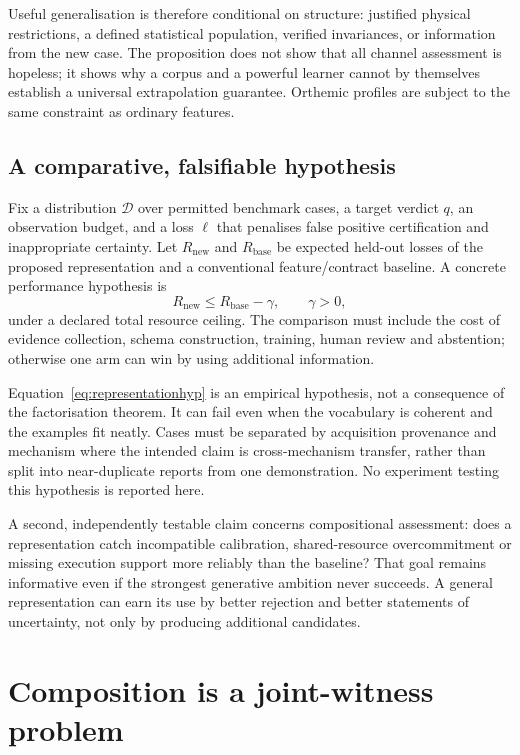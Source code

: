\documentclass[11pt,a4paper]{article}
\theoremstyle{definition}
\theoremstyle{remark}
\begin{document}
Useful generalisation is therefore conditional on structure: justified physical restrictions, a defined statistical population, verified invariances, or information from the new case. The proposition does not show that all channel assessment is hopeless; it shows why a corpus and a powerful learner cannot by themselves establish a universal extrapolation guarantee. Orthemic profiles are subject to the same constraint as ordinary features.

\subsection{A comparative, falsifiable hypothesis}
Fix a distribution $\mathcal D$ over permitted benchmark cases, a target verdict $q$, an observation budget, and a loss $\ell$ that penalises false positive certification and inappropriate certainty. Let $R_{\mathrm{new}}$ and $R_{\mathrm{base}}$ be expected held-out losses of the proposed representation and a conventional feature/contract baseline. A concrete performance hypothesis is
\begin{equation}\label{eq:representationhyp}
 R_{\mathrm{new}}\leq R_{\mathrm{base}}-\gamma,
 \qquad \gamma>0,
\end{equation}
under a declared total resource ceiling. The comparison must include the cost of evidence collection, schema construction, training, human review and abstention; otherwise one arm can win by using additional information.

Equation~\eqref{eq:representationhyp} is an empirical hypothesis, not a consequence of the factorisation theorem. It can fail even when the vocabulary is coherent and the examples fit neatly. Cases must be separated by acquisition provenance and mechanism where the intended claim is cross-mechanism transfer, rather than split into near-duplicate reports from one demonstration. No experiment testing this hypothesis is reported here.

A second, independently testable claim concerns compositional assessment: does a representation catch incompatible calibration, shared-resource overcommitment or missing execution support more reliably than the baseline? That goal remains informative even if the strongest generative ambition never succeeds. A general representation can earn its use by better rejection and better statements of uncertainty, not only by producing additional candidates.


\section{Composition is a joint-witness problem}\label{sec:composition}
\end{document}
